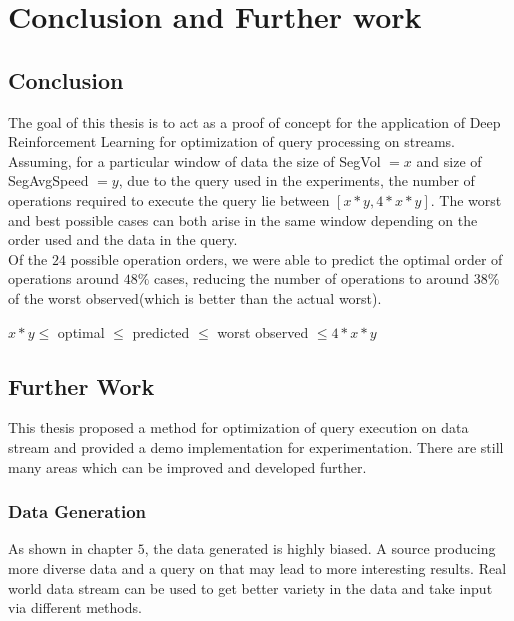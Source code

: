 \chapter{Conclusion and Further work}
\label{chapter:Conclusion_and_further_work}
\thispagestyle{myheadings}

\graphicspath{}

\section{Conclusion}
The goal of this thesis is to act as a proof of concept for the application of Deep Reinforcement Learning for optimization of query processing on streams.\\
Assuming, for a particular window of data the size of SegVol $=x$ and size of SegAvgSpeed $=y$, due to the query used in the experiments, the number of operations required to execute the query lie between $[x*y,4*x*y]$. The worst and best possible cases can both arise in the same window depending on the order used and the data in the query.\\
Of the $24$ possible operation orders, we were able to predict the optimal order of operations around $48\%$ cases, reducing the number of operations to around $38\%$ of the worst observed(which is better than the actual worst).
\begin{center}
$x*y \leq$ optimal $\leq$ predicted $\leq$ worst observed $\leq 4*x*y$
\end{center}

\section{Further Work}
This thesis proposed a method for optimization of query execution on data stream and provided a demo implementation for experimentation. There are still many areas which can be improved and developed further.

\subsection{Data Generation}
As shown in chapter $5$, the data generated is highly biased. A source producing more diverse data and a query on that may lead to more interesting results. Real world data stream can be used to get better variety in the data and take input via different methods.

